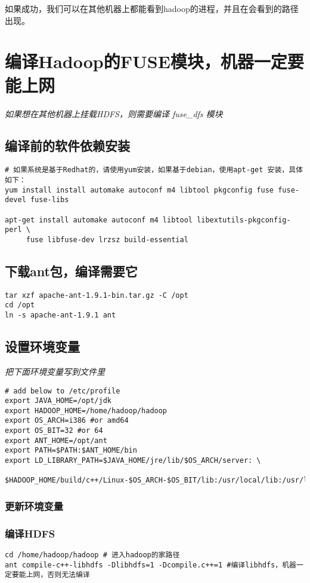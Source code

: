 \documentclass{article}
\begin{document}
如果成功，我们可以在其他机器上都能看到hadoop的进程，并且在会看到的路径
出现。

\section{编译Hadoop的FUSE模块，机器一定要能上网}
\textit{如果想在其他机器上挂载HDFS，则需要编译 fuse\_dfs 模块}
\subsection{编译前的软件依赖安装}
\begin{verbatim}
# 如果系统是基于Redhat的，请使用yum安装，如果基于debian，使用apt-get 安装，具体如下：
yum install install automake autoconf m4 libtool pkgconfig fuse fuse-devel fuse-libs

apt-get install automake autoconf m4 libtool libextutils-pkgconfig-perl \
	 fuse libfuse-dev lrzsz build-essential
\end{verbatim}

\subsection{下载ant包，编译需要它}
\begin{verbatim}
tar xzf apache-ant-1.9.1-bin.tar.gz -C /opt
cd /opt
ln -s apache-ant-1.9.1 ant

\end{verbatim}

\subsection{设置环境变量}
\textit{把下面环境变量写到文件里}
\begin{verbatim}
# add below to /etc/profile
export JAVA_HOME=/opt/jdk
export HADOOP_HOME=/home/hadoop/hadoop
export OS_ARCH=i386 #or amd64
export OS_BIT=32 #or 64
export ANT_HOME=/opt/ant
export PATH=$PATH:$ANT_HOME/bin
export LD_LIBRARY_PATH=$JAVA_HOME/jre/lib/$OS_ARCH/server: \
	$HADOOP_HOME/build/c++/Linux-$OS_ARCH-$OS_BIT/lib:/usr/local/lib:/usr/lib
\end{verbatim}

\subsubsection{更新环境变量}

\subsubsection{编译HDFS}
\begin{verbatim}
cd /home/hadoop/hadoop # 进入hadoop的家路径
ant compile-c++-libhdfs -Dlibhdfs=1 -Dcompile.c++=1 #编译libhdfs，机器一定要能上网，否则无法编译
\end{verbatim}
\end{document}
